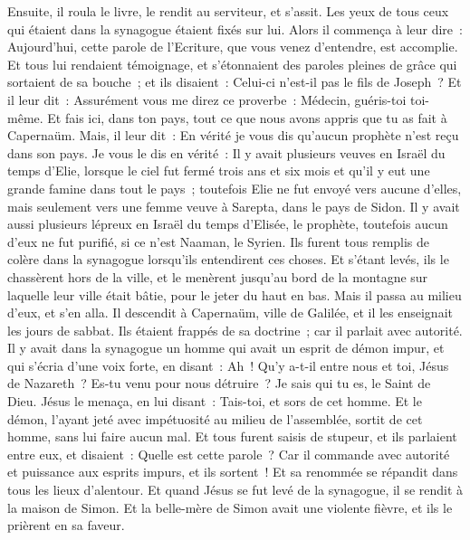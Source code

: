 \begin{multicols}{2}
Ensuite, il roula le livre, le rendit au serviteur, et s'assit. Les yeux de tous ceux qui étaient dans la synagogue étaient fixés sur lui.
Alors il commença à leur dire~: Aujourd'hui, cette parole de l'Ecriture, que vous venez d'entendre, est accomplie.
Et tous lui rendaient témoignage, et s'étonnaient des paroles pleines de grâce qui sortaient de sa bouche~; et ils disaient~: Celui-ci n'est-il pas le fils de Joseph~?
Et il leur dit~: Assurément vous me direz ce proverbe~: Médecin, guéris-toi toi-même. Et fais ici, dans ton pays, tout ce que nous avons appris que tu as fait à Capernaüm.
Mais, il leur dit~: En vérité je vous dis qu'aucun prophète n'est reçu dans son pays.
Je vous le dis en vérité~: Il y avait plusieurs veuves en Israël du temps d'Elie, lorsque le ciel fut fermé trois ans et six mois et qu'il y eut une grande famine dans tout le pays~;
toutefois Elie ne fut envoyé vers aucune d'elles, mais seulement vers une femme veuve à Sarepta, dans le pays de Sidon.
Il y avait aussi plusieurs lépreux en Israël du temps d'Elisée, le prophète, toutefois aucun d'eux ne fut purifié, si ce n'est Naaman, le Syrien.
Ils furent tous remplis de colère dans la synagogue lorsqu'ils entendirent ces choses.
Et s'étant levés, ils le chassèrent hors de la ville, et le menèrent jusqu'au bord de la montagne sur laquelle leur ville était bâtie, pour le jeter du haut en bas.
Mais il passa au milieu d'eux, et s'en alla.
Il descendit à Capernaüm, ville de Galilée, et il les enseignait les jours de sabbat.
Ils étaient frappés de sa doctrine~; car il parlait avec autorité.
Il y avait dans la synagogue un homme qui avait un esprit de démon impur, et qui s'écria d'une voix forte,
en disant~: Ah~! Qu'y a-t-il entre nous et toi, Jésus de Nazareth~? Es-tu venu pour nous détruire~? Je sais qui tu es, le Saint de Dieu.
Jésus le menaça, en lui disant~: Tais-toi, et sors de cet homme. Et le démon, l'ayant jeté avec impétuosité au milieu de l'assemblée, sortit de cet homme, sans lui faire aucun mal.
Et tous furent saisis de stupeur, et ils parlaient entre eux, et disaient~: Quelle est cette parole~? Car il commande avec autorité et puissance aux esprits impurs, et ils sortent~! 
Et sa renommée se répandit dans tous les lieux d'alentour.
Et quand Jésus se fut levé de la synagogue, il se rendit à la maison de Simon. Et la belle-mère de Simon avait une violente fièvre, et ils le prièrent en sa faveur.

\end{multicols}

